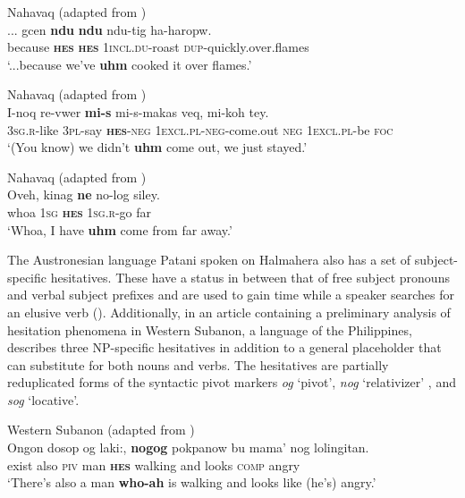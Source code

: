 \documentclass[output=paper]{langscibook}
\begin{document}
\ea\label{ex:intro:8}
{Nahavaq (adapted from \citealt[123]{Dimock2010})}\\
\gll ... gcen \textbf{ndu} \textbf{ndu} ndu-tig ha-haropw. \\
     {} because \textbf{\textsc{hes}} \textbf{\textsc{hes}} \textsc{1incl.du}{}-roast \textsc{dup}{}-quickly.over.flames \\
\glt ‘...because we’ve \textbf{uhm} cooked it over flames.’ 
\z

\ea\label{ex:intro:9}
{Nahavaq (adapted from \citealt[124]{Dimock2010})}\\
\gll I-noq re-vwer \textbf{mi-s} mi-s-makas veq, mi-koh tey. \\
     \textsc{3sg.r}-like \textsc{3pl-}say \textbf{\textsc{hes}}\textsc{-neg} \textsc{1excl.pl-neg}-come.out \textsc{neg} \textsc{1excl.pl}{}-be \textsc{foc} \\
\glt ‘(You know) we didn’t \textbf{uhm} come out, we just stayed.’ 
\z

\ea\label{ex:intro:10}
{Nahavaq (adapted from \citealt[124]{Dimock2010})}\\
\gll Oveh, kinag \textbf{ne} no-log siley. \\
     whoa \textsc{1sg} \textbf{\textsc{hes}} \textsc{1sg.r}{}-go far \\
\glt ‘Whoa, I have \textbf{uhm} come from far away.’ 
\z

The Austronesian language Patani spoken on Halmahera also has a set of subject-specific hesitatives. These have a status in between that of free subject pronouns and verbal subject prefixes and are used to gain time while a speaker searches for an elusive verb (\citealt[113--118]{Sjanes_rodvand2024}). Additionally, in an article containing a preliminary analysis of hesitation phenomena in Western Subanon, a language of the Philippines, \citet{Blake2020} describes three NP-specific hesitatives in addition to a general placeholder that can substitute for both nouns and verbs. The hesitatives are partially reduplicated forms of the syntactic pivot markers \textit{og} ‘pivot’, \textit{nog} ‘relativizer’ , and \textit{sog} ‘locative’.

\ea\label{ex:intro:11}
{Western Subanon (adapted from \citealt[14]{Blake2020})}\\
\gll Ongon dosop og laki:, \textbf{nogog} pokpanow bu mama' nog lolingitan.\\
     exist also \textsc{piv} man \textsc{\textbf{hes}} walking and looks \textsc{comp} angry \\
\glt ‘There’s also a man \textbf{who-ah} is walking and looks like (he’s) angry.’
\z
\end{document}
